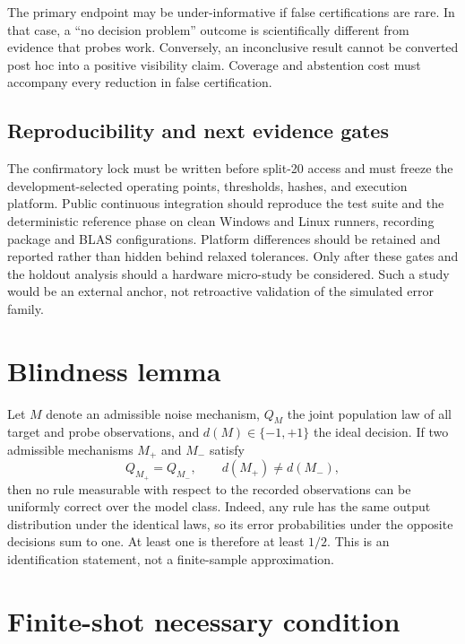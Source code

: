 \documentclass[10pt,twocolumn]{article}
\begin{document}
The primary endpoint may be under-informative if false certifications are rare.
In that case, a ``no decision problem'' outcome is scientifically different
from evidence that probes work. Conversely, an inconclusive result cannot be
converted post hoc into a positive visibility claim. Coverage and abstention
cost must accompany every reduction in false certification.

\subsection{Reproducibility and next evidence gates}

The confirmatory lock must be written before split-20 access and must freeze the
development-selected operating points, thresholds, hashes, and execution
platform. Public continuous integration should reproduce the test suite and
the deterministic reference phase on clean Windows and Linux runners, recording
package and BLAS configurations. Platform differences should be retained and
reported rather than hidden behind relaxed tolerances. Only after these gates
and the holdout analysis should a hardware micro-study be considered. Such a
study would be an external anchor, not retroactive validation of the simulated
error family.




\appendix

\section{Blindness lemma}

Let $M$ denote an admissible noise mechanism, $Q_M$ the joint population law
of all target and probe observations, and $d(M)\in\{-1,+1\}$ the ideal decision.
If two admissible mechanisms $M_+$ and $M_-$ satisfy
\begin{equation}
  Q_{M_+}=Q_{M_-},\qquad d(M_+)\neq d(M_-),
\end{equation}
then no rule measurable with respect to the recorded observations can be
uniformly correct over the model class. Indeed, any rule has the same output
distribution under the identical laws, so its error probabilities under the
opposite decisions sum to one. At least one is therefore at least $1/2$. This
is an identification statement, not a finite-sample approximation.

\section{Finite-shot necessary condition}
\end{document}
